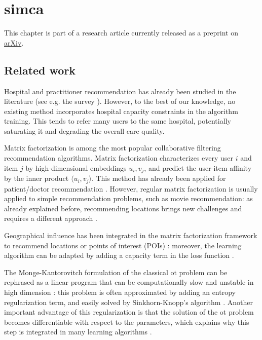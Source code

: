 \chapter{\acf{simca}}

This chapter is part of a research article currently released as a preprint
on \href{https://arxiv.org/abs/2203.10107}{arXiv}.

\section{Related work}
Hospital and practitioner recommendation has already been studied in the
literature (see e.g. the survey \cite{tran_recommender_2021}). However, to the
best of our knowledge, no existing method incorporates hospital capacity
constraints in the algorithm training. This tends to refer many users to the
same hospital, potentially saturating it and degrading the overall care quality.

Matrix factorization \cite{koren_matrix_2009} is among the most popular
collaborative filtering recommendation algorithms. Matrix factorization
characterizes every user $i$ and item $j$ by high-dimensional embeddings $u_i,
    v_j$, and predict the user-item affinity by the inner product $\langle u_i, v_j
    \rangle$. This method has already been applied for patient/doctor recommendation
\cite{zhang_idoctor_2017, han_hybrid_2018}. However, regular matrix
factorization is usually applied to simple recommendation problems, such as
movie recommendation: as already explained before, recommending locations brings
new challenges and requires a different approach \cite{zhao_survey_2016}.

Geographical influence has been integrated in the matrix factorization framework
to recommend locations or points of interest (POIs) \cite{li_rank-geofm_2015}:
moreover, the learning algorithm can be adapted by adding a capacity term in the
loss function \cite{christakopoulou_recommendation_2017}.

The Monge-Kantorovitch formulation of the classical \ac{ot} problem can be
rephrased as a linear program that can be computationally slow and unstable in
high dimension \cite{cuturi_sinkhorn_2013}: this problem is often approximated
by adding an entropy regularization term, and easily solved by Sinkhorn-Knopp's
algorithm \cite{cuturi_sinkhorn_2013}. Another important advantage of this
regularization is that the solution of the \ac{ot} problem becomes
differentiable with respect to the parameters, which explains why this step is
integrated in many learning algorithms
\cite{genevay_learning_2017,cuturi_soft-dtw_2018,tai_sinkhorn_2021}.

